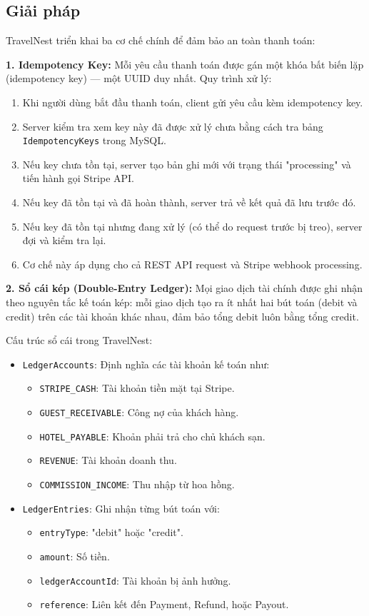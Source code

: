 \documentclass[13pt,a4paper,twoside]{report}
\begin{document}
\subsection{Giải pháp}

TravelNest triển khai ba cơ chế chính để đảm bảo an toàn thanh toán:

\textbf{1. Idempotency Key:}
Mỗi yêu cầu thanh toán được gán một khóa bất biến lặp (idempotency key) --- một UUID duy nhất. Quy trình xử lý:

\begin{enumerate}
  \item Khi người dùng bắt đầu thanh toán, client gửi yêu cầu kèm idempotency key.
  \item Server kiểm tra xem key này đã được xử lý chưa bằng cách tra bảng \texttt{IdempotencyKeys} trong MySQL.
  \item Nếu key chưa tồn tại, server tạo bản ghi mới với trạng thái "processing" và tiến hành gọi Stripe API.
  \item Nếu key đã tồn tại và đã hoàn thành, server trả về kết quả đã lưu trước đó.
  \item Nếu key đã tồn tại nhưng đang xử lý (có thể do request trước bị treo), server đợi và kiểm tra lại.
  \item Cơ chế này áp dụng cho cả REST API request và Stripe webhook processing.
\end{enumerate}

\textbf{2. Sổ cái kép (Double-Entry Ledger):}
Mọi giao dịch tài chính được ghi nhận theo nguyên tắc kế toán kép: mỗi giao dịch tạo ra ít nhất hai bút toán (debit và credit) trên các tài khoản khác nhau, đảm bảo tổng debit luôn bằng tổng credit.

Cấu trúc sổ cái trong TravelNest:

\begin{itemize}
  \item \texttt{LedgerAccounts}: Định nghĩa các tài khoản kế toán như:
  \begin{itemize}
    \item \texttt{STRIPE\_CASH}: Tài khoản tiền mặt tại Stripe.
    \item \texttt{GUEST\_RECEIVABLE}: Công nợ của khách hàng.
    \item \texttt{HOTEL\_PAYABLE}: Khoản phải trả cho chủ khách sạn.
    \item \texttt{REVENUE}: Tài khoản doanh thu.
    \item \texttt{COMMISSION\_INCOME}: Thu nhập từ hoa hồng.
  \end{itemize}
  \item \texttt{LedgerEntries}: Ghi nhận từng bút toán với:
  \begin{itemize}
    \item \texttt{entryType}: "debit" hoặc "credit".
    \item \texttt{amount}: Số tiền.
    \item \texttt{ledgerAccountId}: Tài khoản bị ảnh hưởng.
    \item \texttt{reference}: Liên kết đến Payment, Refund, hoặc Payout.
  \end{itemize}
\end{itemize}
\end{document}
